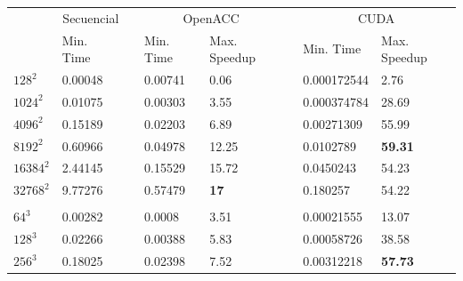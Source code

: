 \begin{table}[H]
    \centering
    \begin{tabular}{llllllll}
    \multicolumn{1}{c}{} & \multicolumn{1}{c}{Secuencial} & \multicolumn{1}{c}{} & \multicolumn{2}{c}{OpenACC} & \multicolumn{1}{c}{} & \multicolumn{2}{c}{CUDA}      \\ 
    \cline{2-2}\cline{4-5}\cline{7-8}
                         & Min. Time                      &                      & Min. Time & Max. Speedup    &                      & Min. Time   & Max. Speedup    \\
    $128^2$                & 0.00048                        &                      & 0.00741   & 0.06            &                      & 0.000172544 & 2.76            \\
    $1024^2$                & 0.01075                        &                      & 0.00303   & 3.55            &                      & 0.000374784 & 28.69           \\
    $4096^2$                & 0.15189                        &                      & 0.02203   & 6.89            &                      & 0.00271309  & 55.99           \\
    $8192^2$                & 0.60966                        &                      & 0.04978   & 12.25           &                      & 0.0102789   & \textbf{59.31}  \\
    $16384^2$                & 2.44145                        &                      & 0.15529   & 15.72           &                      & 0.0450243   & 54.23           \\
    $32768^2$                & 9.77276                        &                      & 0.57479   & \textbf{17}     &                      & 0.180257    & 54.22           \\
                         &                                &                      &           &                 &                      &             &                 \\
    $64^3$                 & 0.00282                        &                      & 0.0008    & 3.51            &                      & 0.00021555  & 13.07           \\
    $128^3$                 & 0.02266                        &                      & 0.00388   & 5.83            &                      & 0.00058726  & 38.58           \\
    $256^3$                 & 0.18025                        &                      & 0.02398   & 7.52            &                      & 0.00312218  & \textbf{57.73}  \\

\end{tabular}
\end{table}
